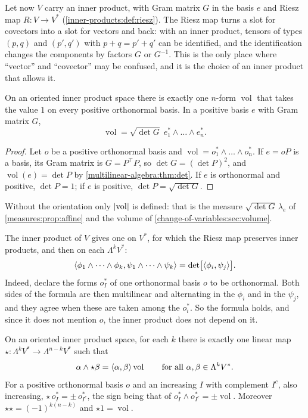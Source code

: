 \begin{notechapter}
Let now $V$ carry an inner product, with Gram matrix $G$ in the basis
$e$ and Riesz map $R:V\to V^*$ (\cref{inner-products:def:riesz}). The
Riesz map turns a slot for covectors into a slot for vectors and back:
with an inner product, tensors of types $(p, q)$ and $(p', q')$ with
$p + q = p' + q'$ can be identified, and the identification changes the
components by factors $G$ or $G^{-1}$. This is the only place where
``vector'' and ``covector'' may be confused, and it is the choice of an
inner product that allows it.

\begin{theorem}\label{multilinear-algebra:thm:volume}
On an oriented inner product space there is exactly one $n$-form
$\operatorname{vol}$ that takes the value $1$ on every positive
orthonormal basis. In a positive basis $e$ with Gram matrix $G$,
\[
  \operatorname{vol} = \sqrt{\det G}\;e_1^*\wedge\dots\wedge e_n^* .
\]
\end{theorem}

\begin{proof}
Let $o$ be a positive orthonormal basis and
$\operatorname{vol} = o_1^*\wedge\dots\wedge o_n^*$. If $e = oP$ is a
basis, its Gram matrix is $G = P^\top P$, so $\det G = (\det P)^2$, and
$\operatorname{vol}(e) = \det P$ by \cref{multilinear-algebra:thm:det}.
If $e$ is orthonormal and positive, $\det P = 1$; if $e$ is positive,
$\det P = \sqrt{\det G}$.
\end{proof}

Without the orientation only $\left|\operatorname{vol}\right|$ is defined:
that is the measure $\sqrt{\det G}\,\lambda_e$ of
\cref{measures:prop:affine} and the volume of
\cref{change-of-variables:sec:volume}.

The inner product of $V$ gives one on $V^*$, for which the Riesz map
preserves inner products, and then on each $\Lambda^kV^*$:
\[
  \left\langle \phi_1\wedge\dots\wedge\phi_k, \psi_1\wedge\dots\wedge\psi_k \right\rangle
  = \det\bigl[\left\langle \phi_i, \psi_j \right\rangle\bigr] .
\]
Indeed, declare the forms $o_I^*$ of one orthonormal basis $o$ to be
orthonormal. Both sides of the formula are then multilinear and
alternating in the $\phi_i$ and in the $\psi_j$, and they agree when
these are taken among the $o_i^*$. So the formula holds, and since it
does not mention $o$, the inner product does not depend on it.

\begin{theorem}\label{multilinear-algebra:thm:hodge}
On an oriented inner product space, for each $k$ there is exactly one
linear map $\star:\Lambda^kV^*\to\Lambda^{n-k}V^*$ such that
\[
  \alpha\wedge\star\beta = \left\langle \alpha, \beta \right\rangle\operatorname{vol}
  \qquad\text{for all }\alpha, \beta\in\Lambda^kV^* .
\]
For a positive orthonormal basis $o$ and an increasing $I$ with
complement $I^c$, also increasing,
$\star\,o_I^* = \pm\,o_{I^c}^*$, the sign being that of
$o_I^*\wedge o_{I^c}^* = \pm\operatorname{vol}$. Moreover
$\star\star = (-1)^{k(n-k)}$ and $\star1 = \operatorname{vol}$.
\end{theorem}


\end{notechapter}
